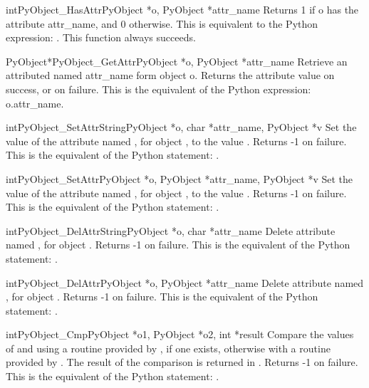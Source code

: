 \begin{cfuncdesc}{int}{PyObject_HasAttr}{PyObject *o, PyObject *attr_name}
Returns 1 if o has the attribute attr_name, and 0 otherwise.
This is equivalent to the Python expression:
. 
This function always succeeds.
\end{cfuncdesc}


\begin{cfuncdesc}{PyObject*}{PyObject_GetAttr}{PyObject *o, PyObject *attr_name}
Retrieve an attributed named attr_name form object o.
Returns the attribute value on success, or \NULL{} on failure.
This is the equivalent of the Python expression: o.attr_name.
\end{cfuncdesc}


\begin{cfuncdesc}{int}{PyObject_SetAttrString}{PyObject *o, char *attr_name, PyObject *v}
Set the value of the attribute named , for object ,
to the value . Returns -1 on failure.  This is
the equivalent of the Python statement: .
\end{cfuncdesc}


\begin{cfuncdesc}{int}{PyObject_SetAttr}{PyObject *o, PyObject *attr_name, PyObject *v}
Set the value of the attribute named , for
object ,
to the value . Returns -1 on failure.  This is
the equivalent of the Python statement: .
\end{cfuncdesc}


\begin{cfuncdesc}{int}{PyObject_DelAttrString}{PyObject *o, char *attr_name}
Delete attribute named , for object . Returns -1 on
failure.  This is the equivalent of the Python
statement: .
\end{cfuncdesc}


\begin{cfuncdesc}{int}{PyObject_DelAttr}{PyObject *o, PyObject *attr_name}
Delete attribute named , for object . Returns -1 on
failure.  This is the equivalent of the Python
statement: .
\end{cfuncdesc}


\begin{cfuncdesc}{int}{PyObject_Cmp}{PyObject *o1, PyObject *o2, int *result}
Compare the values of  and  using a routine provided by
, if one exists, otherwise with a routine provided by .
The result of the comparison is returned in .  Returns
-1 on failure.  This is the equivalent of the Python
statement: .
\end{cfuncdesc}


